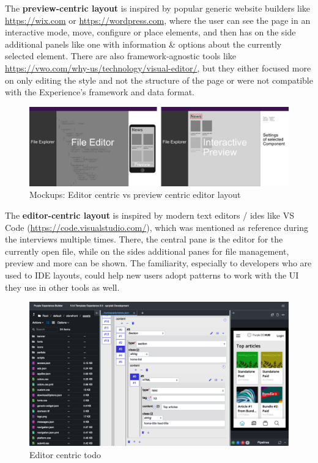 The \textbf{preview-centric layout} is inspired by popular generic website builders like \url{https://wix.com} or \url{https://wordpress.com}, where the user
can see the page in an interactive mode, move, configure or place elements, and then has on the side additional panels like one with information \& options about the
currently selected element.
There are also framework-agnostic tools like \url{https://vwo.com/why-us/technology/visual-editor/}, but they either focused more on only editing the style and not the structure of the page or were not
compatible with the Experience's framework and data format. 
\begin{figure}[h!]
  \includegraphics[width=\textwidth]{pics/editor_centric_vs_preview_centric.png}
  \caption{Mockups: Editor centric vs preview centric editor layout}
\end{figure}
\newpage
The \textbf{editor-centric layout} is inspired by modern text editors / \Gls{ide}s like VS Code (\url{https://code.visualstudio.com/}), which was mentioned as reference during the interviews multiple times.
There, the central pane is the editor for the currently open file, while on the sides additional panes for file management, preview and more can be shown.
The familiarity, especially to developers who are used to IDE layouts, could help new users adopt patterns to work with the UI they use in other tools as well.
\begin{figure}[h!]
  \includegraphics[width=\textwidth]{pics/editor-centric-screenshot.png}
  \caption{Editor centric todo}
  \label{fig:editor-centric}
\end{figure}
